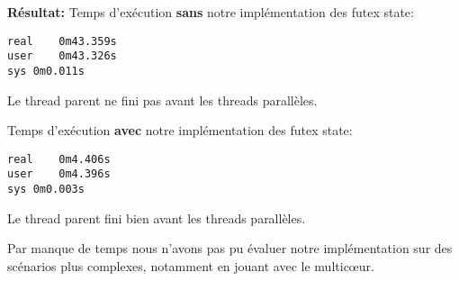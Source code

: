 \noindent \textbf{Résultat:}
Temps d'exécution \textbf{sans} notre implémentation des futex state:
\begin{lstlisting}
real	0m43.359s
user	0m43.326s
sys	0m0.011s
\end{lstlisting}
Le thread parent ne fini pas avant les threads parallèles.

\noindent Temps d'exécution \textbf{avec} notre implémentation des futex state:
\begin{lstlisting}
real	0m4.406s
user	0m4.396s
sys	0m0.003s
\end{lstlisting}
Le thread parent fini bien avant les threads parallèles.

Par manque de temps nous n'avons pas pu évaluer notre implémentation sur des scénarios plus complexes,
notamment en jouant avec le multicœur. 